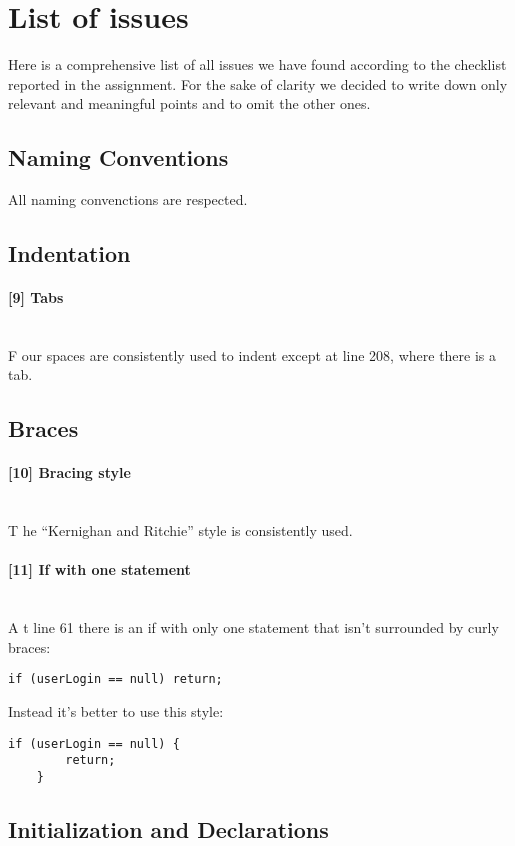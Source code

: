 \newcommand{\code}[1]{\texttt{#1}}
\newcommand{\issue}[3][?]{
    \paragraph{[#1] #2} \mbox{}\\ #3
}

\section{List of issues}

Here is a comprehensive list of all issues we have found according to the
checklist reported in the assignment.
For the sake of clarity we decided to write down only relevant and 
meaningful points and to omit the other ones.

\subsection{Naming Conventions}

All naming convenctions are respected.

\subsection{Indentation}

\issue[9]{Tabs}
	Four spaces are consistently used to indent except at line 208, where there is a tab.

\subsection{Braces}

\issue[10]{Bracing style}
	The ``Kernighan and Ritchie'' style is consistently used.

\issue[11]{If with one statement}
	At line 61 there is an if with only one statement that isn't surrounded by curly braces:
	\begin{lstlisting}[basicstyle=\small\ttfamily,columns=fullflexible]
	if (userLogin == null) return;
	\end{lstlisting}
	Instead it's better to use this style:
	\begin{lstlisting}[basicstyle=\small\ttfamily,columns=fullflexible]
	if (userLogin == null) {
		return;
	}
	\end{lstlisting}

\subsection{Initialization and Declarations}

